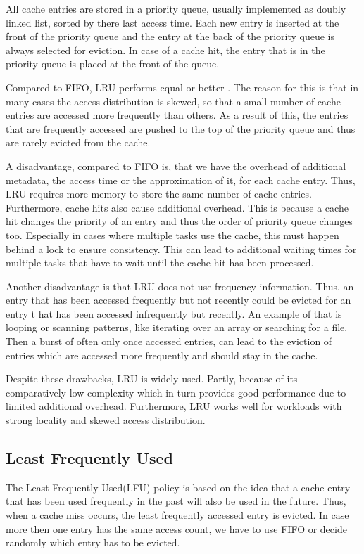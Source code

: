\documentclass[
	12pt,
	a4paper,
	abstract,
	bibliography=totoc,
	chapterprefix,
	headings=openright,
	numbers=endperiod,
	parskip=half,
	twoside,
]{scrreprt}
\begin{document}
All cache entries are stored in a priority queue, usually implemented as doubly linked list, sorted by there last access time.
Each new entry is inserted at the front of the priority queue and the entry at the back of the priority queue is always selected for eviction.
In case of a cache hit, the entry that is in the priority queue is placed at the front of the queue.

Compared to FIFO, LRU performs equal or better \cite{van1992lru}.
The reason for this is that in many cases the access distribution is skewed, so that a small number of 
cache entries are accessed more frequently than others.
As a result of this, the entries that are frequently accessed are pushed to the top of the priority queue and 
thus are rarely evicted from the cache.

A disadvantage, compared to FIFO is, that we have the overhead of additional metadata, the access time or the approximation of it, 
for each cache entry.
Thus, LRU requires more memory to store the same number of cache entries.
Furthermore, cache hits also cause additional overhead. 
This is because a cache hit changes the priority of an entry and thus the order of priority queue changes too.
Especially in cases where multiple tasks use the cache, this must happen behind a lock to ensure consistency.
This can lead to additional waiting times for multiple tasks that have to wait until the cache hit has been processed.

Another disadvantage is that LRU does not use frequency information.
Thus, an entry that has been accessed frequently but not recently could be evicted for an entry t
hat has been accessed infrequently but recently.
An example of that is looping or scanning patterns, like iterating over an array or searching for a file.
Then a burst of often only once accessed entries, can lead to the eviction of entries which are accessed more frequently and 
should stay in the cache.

Despite these drawbacks, LRU is widely used.
Partly, because of its comparatively low complexity 
which in turn provides good performance due to limited additional overhead.
Furthermore, LRU works well for workloads with strong locality and skewed access distribution.

\subsection{Least Frequently Used}

The Least Frequently Used(LFU) policy is based on the idea that a cache entry that has been used frequently in the past will 
also be used in the future.
Thus, when a cache miss occurs, the least frequently accessed entry is evicted.
In case more then one entry has the same access count, we have to use FIFO or decide randomly which entry has to be evicted.
\end{document}
